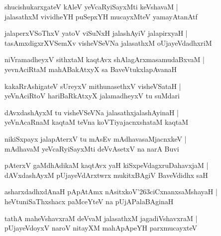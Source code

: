 \documentclass[twoside,12pt,openright]{book}
\def\S{\char'263}
\newcounter{shloka}[chapter]
\begin{document}
\begin{shloka}%
shucishukarxgateV kAleV yeVcaRyiSayxMti keVshavaM |\\
jalasathxM vividheYH puSepxYH mucayxMteV yamayAtanAtf 
\end{shloka}

\begin{shloka}%
jalaperxVSoThxV yatoV viSuNxH jalashAyiV jalapirxyaH |\\
tasAmxdigxrXVSemXv visheVSeVNa jalasathxM oUjayeVdadhxriM 
\end{shloka}

\begin{shloka}%
niVramadheyxV sithxtaM kaqtAvx shAlagArxmasamudaBxvaM |\\
yevnAciRtaM mahABakAtxyX sa BaveVtukxlapAvanaH 
\end{shloka}

\begin{shloka}%
kakaRrAshigateV sUreyxV mithunasethxV visheVSataH |\\
yeVnAciRtoV hariBaRkAtxyX jalamadheyxV tu suMdari 
\end{shloka}

\begin{shloka}%
dAvxdashAyxM tu visheVSeVNa jalasathxjalashAyinaH |\\
yeVnAcaRnaM kaqtaM teVna koVTiyajacnxshataM kaqtaM 
\end{shloka}

\begin{shloka}%
nikiSxpayx jalapAterxV tu mAsEv mAdhavasaMjacnxkeV |\\
mAdhavaM yeVcaRyiSayxMti deVvAsetxV na narA Buvi
\end{shloka}

\begin{shloka}%
pAterxV gaMdhAdikaM kaqtAvx yaH kiSxpeVdagxruDahavxjaM |\\
dAVxdashAyxM pUjayeVdArxtwrx mukitxBAgiV BaveVdidhx saH 
\end{shloka}

\begin{shloka}%
asharxdadhxdAnaH pApAtAmx nAsitxkoV\S ciCxnanxsaMshayaH |\\
heVtuniSaThxshacx paMceYteV na pUjAPalaBAginaH
\end{shloka}

\begin{shloka}%
tathA maheVshavxraM deVvaM jalasathxM jagadiVshavxraM |\\
pUjayeVdoyxV naroV nitayXM mahApApeYH parxmucayxteV 
\end{shloka}
\end{document}
